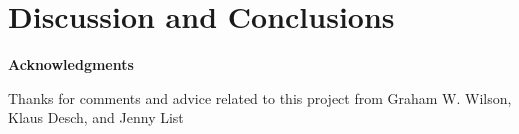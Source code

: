 \documentclass[12pt]{article}
\def\Acknowledgments{\bigskip  \bigskip \begin{center} \begin{large}
             \bf Acknowledgments \end{large}\end{center}}
\begin{document}






\section{Discussion and Conclusions}
\label{conclude}



%




\Acknowledgments
Thanks for comments and advice related to this project from Graham W. Wilson, Klaus Desch, and Jenny List

%



\end{document}
